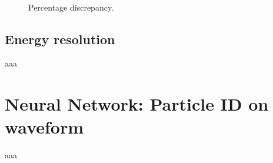 \begin{figure}
	\centering
	 \\
	\caption{Percentage discrepancy.}
	\label{fig:sat_events}
\end{figure}



\subsection{Energy resolution} \label{subsec:E_res}
aaa

\section{Neural Network: Particle ID on waveform} \label{sec:NN_waveform}
aaa

